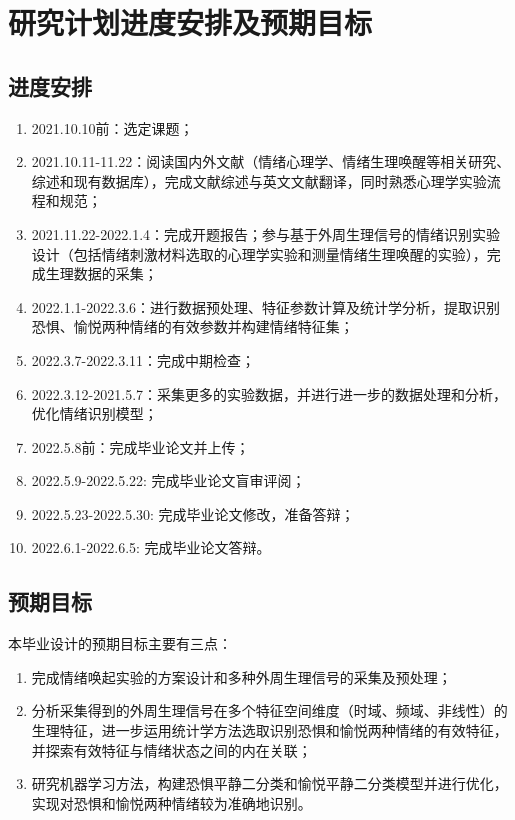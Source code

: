 \section{研究计划进度安排及预期目标}

\subsection{进度安排}
\begin{enumerate}
    \item 2021.10.10前：选定课题；
    \item 2021.10.11-11.22：阅读国内外文献（情绪心理学、情绪生理唤醒等相关研究、综述和现有数据库），完成文献综述与英文文献翻译，同时熟悉心理学实验流程和规范；
    \item 2021.11.22-2022.1.4：完成开题报告；参与基于外周生理信号的情绪识别实验设计（包括情绪刺激材料选取的心理学实验和测量情绪生理唤醒的实验），完成生理数据的采集；
    \item 2022.1.1-2022.3.6：进行数据预处理、特征参数计算及统计学分析，提取识别恐惧、愉悦两种情绪的有效参数并构建情绪特征集；
    \item 2022.3.7-2022.3.11：完成中期检查；
    \item 2022.3.12-2021.5.7：采集更多的实验数据，并进行进一步的数据处理和分析，优化情绪识别模型；
    \item 2022.5.8前：完成毕业论文并上传；
    \item 2022.5.9-2022.5.22: 完成毕业论文盲审评阅；
    \item 2022.5.23-2022.5.30: 完成毕业论文修改，准备答辩；
    \item 2022.6.1-2022.6.5: 完成毕业论文答辩。
\end{enumerate}

\subsection{预期目标}
本毕业设计的预期目标主要有三点：
\begin{enumerate}
    \item 完成情绪唤起实验的方案设计和多种外周生理信号的采集及预处理；
    \item 分析采集得到的外周生理信号在多个特征空间维度（时域、频域、非线性）的生理特征，进一步运用统计学方法选取识别恐惧和愉悦两种情绪的有效特征，并探索有效特征与情绪状态之间的内在关联；
    \item 研究机器学习方法，构建恐惧平静二分类和愉悦平静二分类模型并进行优化，实现对恐惧和愉悦两种情绪较为准确地识别。
\end{enumerate}
